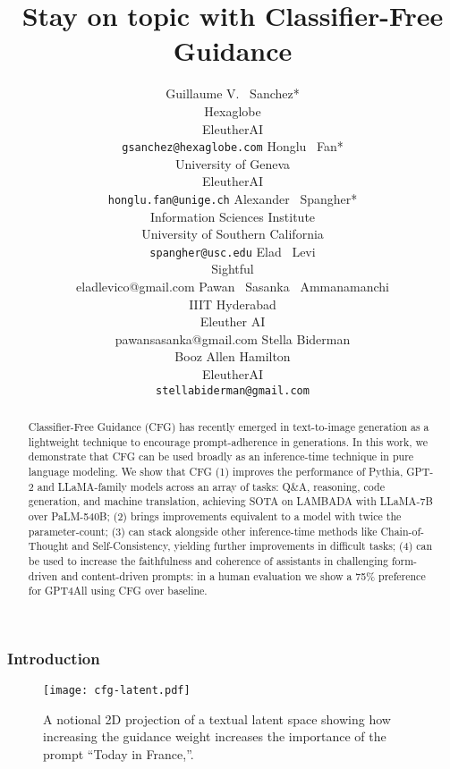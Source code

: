 \documentclass{article}
\title{Stay on topic with Classifier-Free Guidance}
\author{Guillaume V. ~Sanchez* \\
  Hexaglobe \\
  EleutherAI \\
  \texttt{gsanchez@hexaglobe.com}
  \And
  Honglu ~Fan* \\
  University of Geneva\\
  EleutherAI\\
  \texttt{honglu.fan@unige.ch}
  \And
  Alexander ~Spangher*\\
  Information Sciences Institute\\University of Southern California \\
  \texttt{spangher@usc.edu}
  \And
  Elad ~Levi \\
  Sightful \\
  eladlevico@gmail.com
  \And
  Pawan ~Sasanka ~Ammanamanchi\\
  IIIT Hyderabad \\
  Eleuther AI \\
  pawansasanka@gmail.com
  \And
  Stella Biderman\\
  Booz Allen Hamilton\\
  EleutherAI\\
  \texttt{stellabiderman@gmail.com}
}
\begin{document}
\doparttoc \faketableofcontents \part{} 

\maketitle

\def\thefootnote{*}\def\thefootnote{\arabic{footnote}}

\begin{abstract}
Classifier-Free Guidance (CFG) \cite{cfg} has recently emerged in text-to-image generation as a lightweight technique to encourage prompt-adherence in generations. In this work, we demonstrate that CFG can be used broadly as an inference-time technique in pure language modeling. We show that CFG (1) improves the performance of Pythia, GPT-2 and LLaMA-family models across an array of tasks: Q\&A, reasoning, code generation, and machine translation, achieving SOTA on LAMBADA with LLaMA-7B over PaLM-540B; (2) brings improvements equivalent to a model with twice the parameter-count; (3) can stack alongside other inference-time methods like Chain-of-Thought and Self-Consistency, yielding further improvements in difficult tasks; (4) can be used to increase the faithfulness and coherence of assistants in challenging form-driven and content-driven prompts: in a human evaluation we show a 75\% preference for GPT4All using CFG over baseline.
\end{abstract}


\section{Introduction}
\label{sct:introduction}


\begin{wrapfigure}{r}{0.5\textwidth}

  \vspace{-4em}
  \begin{center}
  \texttt{[image: cfg-latent.pdf]}
  \end{center}
  \vspace{-1em}
  \caption{A notional 2D projection of a textual latent space showing how increasing the guidance weight  increases the importance of the prompt ``Today in France,''.}
    \label{fig:cfg-latent}

\end{wrapfigure}
\end{document}
